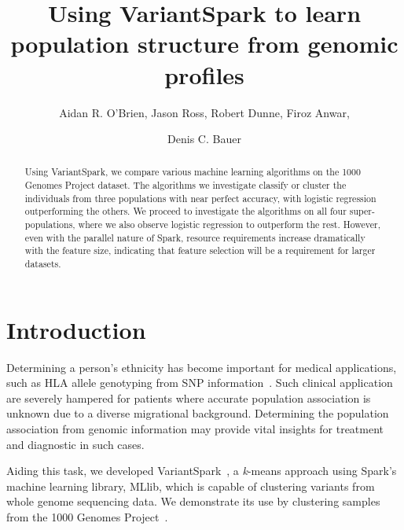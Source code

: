 \documentclass{llncs}
\newcommand{\variantSpark}{{\sc VariantSpark}}
\newcommand{\kMeans}{\textit{k}-means }
\begin{document}
\setcounter{save}{\value{section}}
{\def\addtocontents#1#2{}%
\def\addcontentsline#1#2#3{}%
\def\markboth#1#2{}%
%
\title{Using VariantSpark to learn population structure from genomic profiles}

\author{Aidan R. O'Brien, Jason Ross, Robert Dunne, Firoz Anwar, \and Denis C. Bauer}


\maketitle
%
\begin{abstract}
Using VariantSpark, we compare various machine learning algorithms on the 1000 Genomes Project dataset.
The algorithms we investigate classify or cluster the individuals from three populations with near perfect accuracy,
with logistic regression outperforming the others.
We proceed to investigate the algorithms on all four super-populations, where we also observe
logistic regression to outperform the rest.
However, even with the parallel nature of {\sc Spark}, resource requirements increase dramatically with the feature size,
indicating that feature selection will be a requirement for larger datasets.

\end{abstract}
%
\section{Introduction}
%


Determining a person's ethnicity has become important for medical applications, such as HLA allele genotyping from SNP
information~\cite{Zheng2014}. Such clinical application are severely hampered for patients where accurate population
association is unknown due to a diverse migrational background. Determining the population association from genomic
information may provide vital insights for treatment and diagnostic in such cases.

Aiding this task, we developed \variantSpark~\cite{OBrien}, a \kMeans{} approach using {\sc Spark}'s machine learning
library, {\sc MLlib}, which is capable of clustering variants from whole genome sequencing data.  We demonstrate its use
by clustering samples from the 1000 Genomes Project~\cite{1KG2012}. 

}
\end{document}
